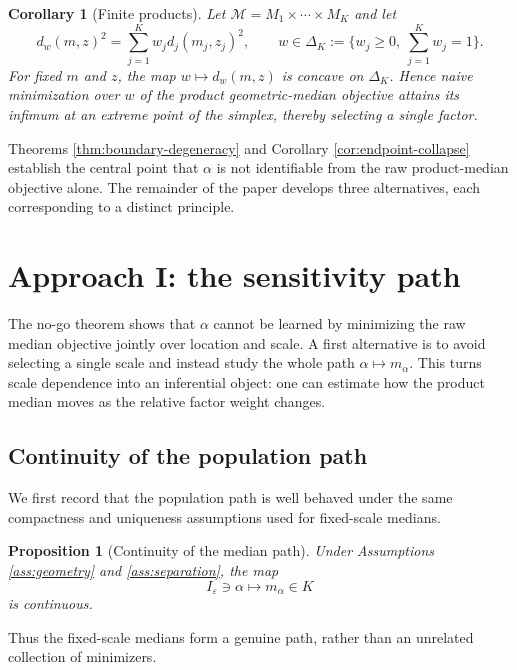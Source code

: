 \documentclass[11pt]{article}
\newtheorem{proposition}[theorem]{Proposition}
\newtheorem{corollary}[theorem]{Corollary}
\newcommand{\M}{\mathcal M}
\newcommand{\eps}{\varepsilon}
\newcommand{\1}{\mathbf{1}}
\begin{document}
\begin{corollary}[Finite products]\label{cor:kfactor}
Let $\M=M_1\times\cdots\times M_K$ and let
\[
 d_w(m,z)^2=\sum_{j=1}^K w_jd_j(m_j,z_j)^2,
 \qquad
 w\in\Delta_K:=\{w_j\ge0,\ \sum_{j=1}^Kw_j=1\}.
\]
For fixed $m$ and $z$, the map $w\mapsto d_w(m,z)$ is concave on $\Delta_K$.  Hence naive minimization over $w$ of the product geometric-median objective attains its infimum at an extreme point of the simplex, thereby selecting a single factor.
\end{corollary}



Theorems \ref{thm:boundary-degeneracy} and Corollary \ref{cor:endpoint-collapse} establish the central point that $\alpha$ is not identifiable from the raw product-median objective alone.  The remainder of the paper develops three alternatives, each corresponding to a distinct  principle.


\section{Approach I: the sensitivity path}\label{sec:path}

The no-go theorem shows that $\alpha$ cannot be learned by minimizing the raw
median objective jointly over location and scale.  A first alternative is to
avoid selecting a single scale and instead study the whole path
$\alpha\mapsto m_\alpha$.  This turns scale dependence into an inferential
object: one can estimate how the product median moves as the relative factor
weight changes.

\subsection{Continuity of the population path}

We first record that the population path is well behaved under the same
compactness and uniqueness assumptions used for fixed-scale medians.

\begin{proposition}[Continuity of the median path]\label{prop:path-continuity}
Under Assumptions \ref{ass:geometry} and \ref{ass:separation}, the map
\[
 I_\eps\ni\alpha\mapsto m_\alpha\in K
\]
is continuous.
\end{proposition}




Thus the fixed-scale medians form a genuine path, rather than an unrelated
collection of minimizers.
\end{document}
